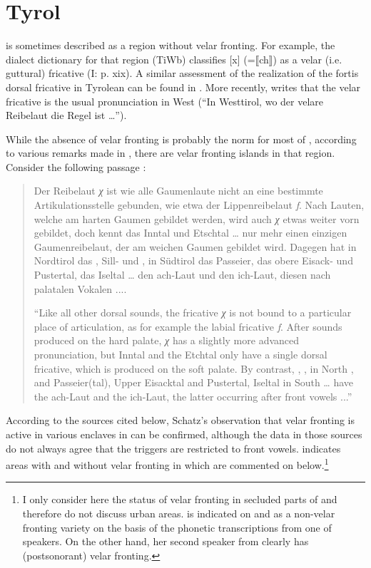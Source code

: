 \section{{Tyrol}}\label{sec:15.10}

 is sometimes described as a region without velar fronting. For example, the dialect dictionary for that region (TiWb) classifies [x] (=⟦ch⟧) as a velar (i.e. guttural) fricative (I: p. xix). A similar assessment of the realization of the fortis dorsal fricative in Tyrolean can be found in \citet[96]{Luick1904}. More recently, \citet[73]{Gabriel1985} writes that the velar fricative is the usual pronunciation in West  (“In Westtirol, wo der velare Reibelaut die Regel ist …”).

While the absence of velar fronting is probably the norm for most of , according to various remarks made in \citet{Schatz1903}, there are velar fronting islands in that region. Consider the following passage \citep[21]{Schatz1903}:

\begin{quote}
Der Reibelaut \textit{χ} ist wie alle Gaumenlaute nicht an eine bestimmte Artikulationsstelle gebunden, wie etwa der Lippenreibelaut \textit{f}. Nach Lauten, welche am harten Gaumen gebildet werden, wird auch \textit{χ} etwas weiter vorn gebildet, doch kennt das Inntal und Etschtal … nur mehr einen einzigen Gaumenreibelaut, der am weichen Gaumen gebildet wird. Dagegen hat in Nordtirol das , Sill- und , in Südtirol das Passeier, das obere Eisack- und Pustertal, das Iseltal … den ach-Laut und den ich-Laut, diesen nach palatalen Vokalen ....

“Like all other dorsal sounds, the fricative \textit{χ} is not bound to a particular place of articulation, as for example the labial fricative \textit{f}. After sounds produced on the hard palate, \textit{χ} has a slightly more advanced pronunciation, but Inntal and the Etchtal only have a single dorsal fricative, which is produced on the soft palate. By contrast, , ,  in North , and Passeier(tal), Upper Eisacktal and Pustertal, Iseltal in South  … have the ach-Laut and the ich-Laut, the latter occurring after front vowels ...”
\end{quote}

According to the sources cited below, Schatz’s observation that velar fronting is active in various enclaves in  can be confirmed, although the data in those sources do not always agree that the triggers are restricted to front vowels.  indicates areas with and without velar fronting in  which are commented on below.\footnote{{I only consider here the status of velar fronting in secluded parts of  and therefore do not discuss urban areas.  is indicated on  and  as a non-velar fronting variety on the basis of the phonetic transcriptions from one of  speakers. On the other hand, her second speaker from  clearly has (postsonorant) velar fronting.}}

